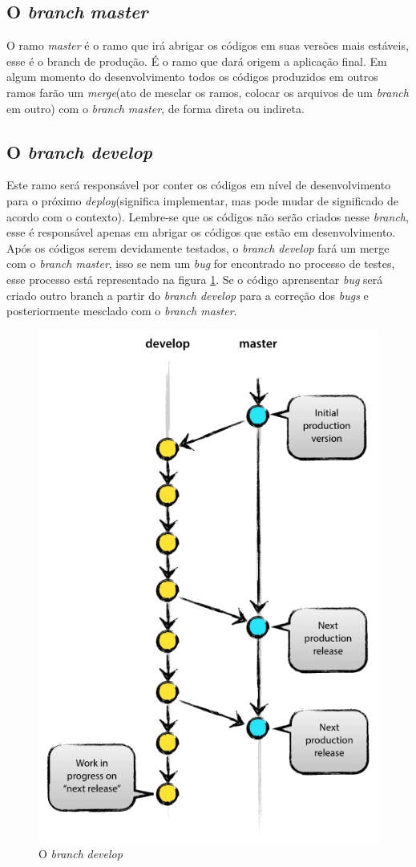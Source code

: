 \documentclass[12pt,openright,oneside,a4paper,english,brazil]{abntex2}
\begin{document}
\subsection{O \textit{branch} \textit{master}}

O ramo \textit{master} é o ramo que irá abrigar os códigos em suas versões mais estáveis, esse é o branch de produção. É o ramo que dará origem a aplicação final. Em algum momento do desenvolvimento todos os códigos produzidos em outros ramos farão um \textit{merge}(ato de mesclar os ramos, colocar os arquivos de um \textit{branch} em outro) com o \textit{branch master}, de forma direta ou indireta.

\subsection{O \textit{branch develop}}

Este ramo será responsável por conter os códigos em nível de desenvolvimento para o próximo \textit{deploy}(significa implementar, mas pode mudar de significado de acordo com o contexto). Lembre-se que os códigos não serão criados nesse \textit{branch}, esse é responsável apenas em abrigar os códigos que estão em desenvolvimento. Após os códigos serem devidamente testados, o \textit{branch develop} fará um merge com o \textit{branch master}, isso se nem um \textit{bug} for encontrado no processo de testes, esse processo está representado na figura \ref{develop}. Se o código aprensentar \textit{bug} será criado outro branch a partir do \textit{branch develop} para a correção dos \textit{bugs} e posteriormente mesclado com o \textit{branch master}.

\begin{figure}[h]
	\caption{\label{develop}O \textit{branch} \textit{develop}}
	\begin{center}
		\includegraphics[width=0.6\linewidth]{develop}
	\end{center}
\end{figure}
	
\end{document}
